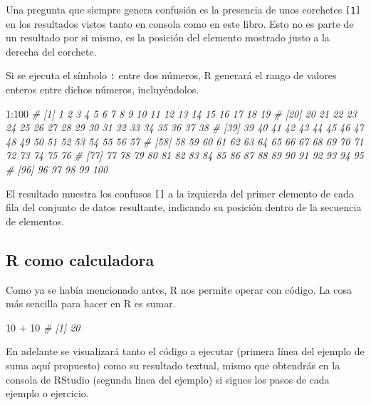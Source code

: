 \documentclass[
]{article}
\newenvironment{Shaded}{\begin{snugshade}}{\end{snugshade}}
\newcommand{\CommentTok}[1]{\textcolor[rgb]{0.56,0.35,0.01}{\textit{#1}}}
\newcommand{\DecValTok}[1]{\textcolor[rgb]{0.00,0.00,0.81}{#1}}
\newcommand{\SpecialCharTok}[1]{\textcolor[rgb]{0.00,0.00,0.00}{#1}}
\theoremstyle{definition}
\theoremstyle{definition}
\theoremstyle{definition}
\theoremstyle{definition}
\theoremstyle{remark}
\begin{document}
Una pregunta que siempre genera confusión es la presencia de unos corchetes \texttt{{[}1{]}} en los resultados vistos tanto en consola como en este libro. Esto no es parte de un resultado por si mismo, es la posición del elemento mostrado justo a la derecha del corchete.

Si se ejecuta el símbolo \texttt{:} entre dos números, R generará el rango de valores enteros entre dichos números, incluyéndolos.

\begin{Shaded}
\begin{Highlighting}[]
\DecValTok{1}\SpecialCharTok{:}\DecValTok{100}
\CommentTok{\#   [1]   1   2   3   4   5   6   7   8   9  10  11  12  13  14  15  16  17  18  19}
\CommentTok{\#  [20]  20  21  22  23  24  25  26  27  28  29  30  31  32  33  34  35  36  37  38}
\CommentTok{\#  [39]  39  40  41  42  43  44  45  46  47  48  49  50  51  52  53  54  55  56  57}
\CommentTok{\#  [58]  58  59  60  61  62  63  64  65  66  67  68  69  70  71  72  73  74  75  76}
\CommentTok{\#  [77]  77  78  79  80  81  82  83  84  85  86  87  88  89  90  91  92  93  94  95}
\CommentTok{\#  [96]  96  97  98  99 100}
\end{Highlighting}
\end{Shaded}

El resultado muestra los confusos \texttt{{[}{]}} a la izquierda del primer elemento de cada fila del conjunto de datos resultante, indicando su posición dentro de la secuencia de elementos.

\hypertarget{r-como-calculadora}{%
\subsection{R como calculadora}\label{r-como-calculadora}}

Como ya se había mencionado antes, R nos permite operar con código. La cosa más sencilla para hacer en R es sumar.

\begin{Shaded}
\begin{Highlighting}[]
\DecValTok{10} \SpecialCharTok{+} \DecValTok{10}
\CommentTok{\# [1] 20}
\end{Highlighting}
\end{Shaded}

\begin{rstudio-tip}
En adelante se visualizará tanto el código a ejecutar (primera línea del ejemplo de suma aquí propuesto) como su resultado textual, mismo que obtendrás en la consola de RStudio (segunda línea del ejemplo) si sigues los pasos de cada ejemplo o ejercicio.
\end{rstudio-tip}
\end{document}
